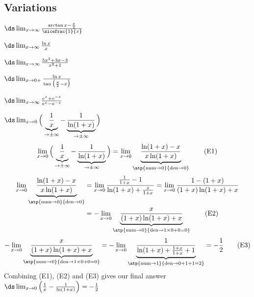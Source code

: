 \subsection{Variations}
\begin{ex}
  $\ds\lim_{x\to\infty} \frac{\arctan x - \frac{\pi}{2}}{ \nicefrac{1}{x}}$
\end{ex}
\begin{ex}
  $\ds\lim_{x \to \infty} \frac{\ln x}{x}$
\end{ex}
\begin{ex}
  $\ds\lim_{x \to \infty} \frac{5x^2+3x-3}{x^2+1}$
\end{ex}
\begin{ex}
  $\ds\lim_{x\to 0+} \frac{\ln x}{\tan\big(\frac{\pi}{2}-x\big)}$
\end{ex}
\begin{ex}
  $\ds\lim_{x\to\infty} \frac{e^x + e^{-x}}{e^x - e^{-x}}$
\end{ex}
\begin{ex}
  $\ds\lim_{x\to 0}\Big(\underbrace{\frac{1}{x}}_{\to \pm\infty} - \underbrace{\frac{1}{\ln(1+x)}}_{\to\pm\infty}\Big)$
\begin{equation}
\lim_{x\to 0}\Big(\underbrace{\frac{1}{x}}_{\to \pm\infty} - \underbrace{\frac{1}{\ln(1+x)}}_{\to\pm\infty}\Big)
=\lim_{x\to 0}\underbrace{\frac{\ln(1+x)-x}{x\ln(1+x)}}_{\atp{\mathrm{num}\to 0}{\mathrm{den}\to 0}}\tag{E1}
\end{equation}
\begin{align}
\lim_{x\to 0}\underbrace{\frac{\ln(1+x)-x}{x\ln(1+x)}}_{\atp{\mathrm{num}\to 0}{\mathrm{den}\to 0}}
&=\lim_{x\to 0}\frac{\frac{1}{1+x}-1} {\ln(1+x)+\frac{x}{1+x}}
=\lim_{x\to 0}\frac{1-(1+x)} {(1+x)\ln(1+x)+x}\notag\\
&=-\lim_{x\to 0}\underbrace{\frac{x} {(1+x)\ln(1+x)+x}}_{\atp{\mathrm{num}\to 0}{\mathrm{den}\to 1\times 0+0=0}} \tag{E2}
\end{align}
\begin{equation}
-\lim_{x\to 0}\underbrace{\frac{x} {(1+x)\ln(1+x)+x}}_{\atp{\mathrm{num}\to 0}{\mathrm{den}\to 1\times 0+0=0}}
=-\lim_{x\to 0}\underbrace{\frac{1} {\ln(1+x)+\frac{1+x}{1+x}+1}}_{\atp{\mathrm{num}\to 1}{\mathrm{den}\to 0+1+1=2}}
=-\frac{1}{2}
\tag{E3}
\end{equation}
Combining (E1), (E2) and (E3) gives our final answer
  $\ds\lim_{x\to 0}\Big(\frac{1}{x} - \frac{1}{\ln(1+x)}\Big) = -\frac{1}{2}$
\end{ex}
